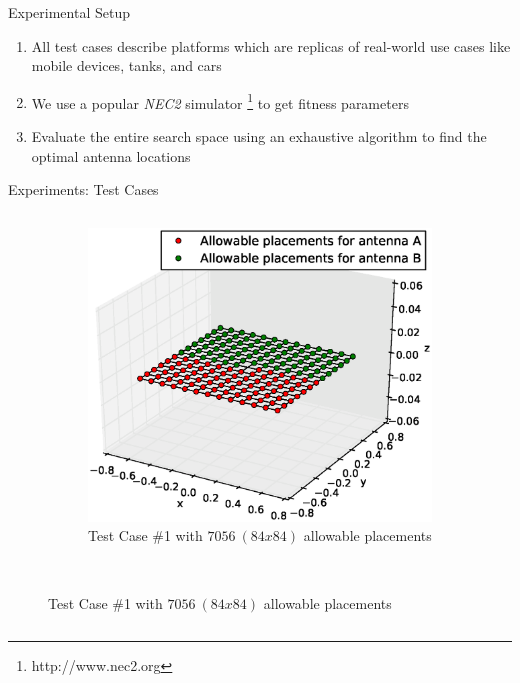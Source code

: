 \documentclass{beamer}
\begin{document}
\begin{frame}{Experimental Setup}
    \begin{enumerate}\itemsep1.5em
        \item All test cases describe platforms which are replicas of real-world use cases like mobile devices, tanks, and cars
        \item We use a popular \textit{NEC2} simulator \footnote{http://www.nec2.org} to get fitness parameters 
        \item Evaluate the entire search space using an exhaustive algorithm to find the optimal antenna locations
    \end{enumerate}
    \vspace{10mm}
\end{frame}


\begin{frame}{Experiments: Test Cases}
    \begin{columns}
        \begin{column}{.5\columnwidth}
            \begin{figure}
        \vspace*{-0.5cm}
                \centering
                \begin{subfigure}{\columnwidth}
                    \includegraphics[trim=0 30 0 50, clip,scale=0.25]{../paper/FIG/tc1_figure}%
                    \caption*{\tiny Test Case \#1 with $7056~(84x84)$ allowable placements}%
                \end{subfigure}\hfill\\

\end{figure}
\end{column}
\end{columns}
\end{frame}
\end{document}
